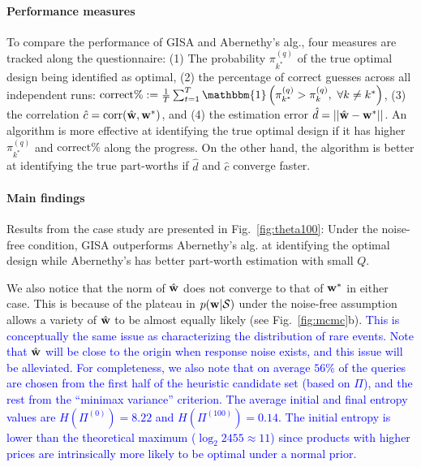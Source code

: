 \documentclass[onecolumn,11pt]{article}
\newcommand{\highlight}[1]{{\textcolor{blue}{{#1}}}}
\newcommand{\highlight}[1]{{{#1}}}
\begin{document}
\paragraph{Performance measures} To compare the performance of GISA and Abernethy's alg., four measures are tracked along the questionnaire: (1) The probability $\pi_{k^*}^{(q)}$ of the true optimal design being identified as optimal, (2) the percentage of correct guesses across all independent runs: $\text{correct\%} := \frac{1}{T}\sum_{t=1}^T\mathbbm{1}\left(\pi_{k^*}^{(q)} >
\pi_{k}^{(q)},~\forall k \neq k^*\right)$, (3) the correlation $\hat{c} = \text{corr}(\hat{\bf w},{\bf w}^*)$, and (4) the estimation error $\hat{d} = ||\hat{\bf w}-{\bf w}^*||$. An algorithm is more effective at identifying the true optimal design if it has higher $\pi_{k^*}^{(q)}$ and $\text{correct\%}$ along the progress. On the other hand, the algorithm is better at identifying the true part-worths if $\hat{d}$ and $\hat{c}$ converge faster.

\paragraph{Main findings} Results from the case study are presented in Fig.~\ref{fig:theta100}: Under the noise-free condition, GISA outperforms Abernethy's alg. at identifying the optimal design while Abernethy's has better part-worth estimation with small $Q$. 

We also notice that the norm of $\hat{\bf w}$ does not converge to that of ${\bf w}^*$ in either case. This is because of the plateau in $p({\bf w}|\mathcal{S})$ under the noise-free assumption allows a variety of $\hat{\bf w}$ to be almost equally likely (see Fig.~\ref{fig:mcmc}b). \highlight{This is conceptually the same issue as characterizing the distribution of rare events. Note that $\hat{\bf w}$ will be close to the origin when response noise exists, and this issue will be alleviated. For completeness, we also note that on average $56\%$ of the queries are chosen from the first half of the heuristic candidate set (based on $\Pi$), and the rest from the ``minimax variance'' criterion. The average initial and final entropy values are $H(\Pi^{(0)}) = 8.22$ and $H(\Pi^{(100)}) = 0.14$. The initial entropy is lower than the theoretical maximum ($\log_2{2455}\approx 11$) since products with higher prices are intrinsically more likely to be optimal under a normal prior.}
\end{document}
